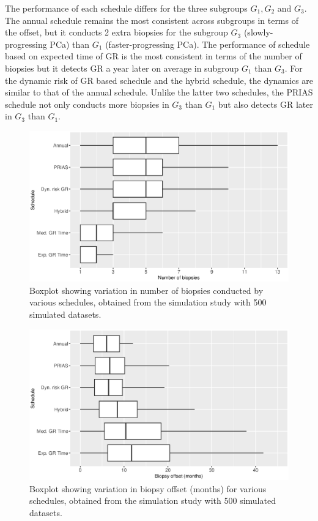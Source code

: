 The performance of each schedule differs for the three subgroups $G_1, G_2$ and $G_3$. The annual schedule remains the most consistent across subgroups in terms of the offset, but it conducts 2 extra biopsies for the subgroup $G_3$ (slowly-progressing PCa) than $G_1$ (faster-progressing PCa). The performance of schedule based on expected time of GR is the most consistent in terms of the number of biopsies but it detects GR a year later on average in subgroup $G_1$ than $G_3$. For the dynamic risk of GR based schedule and the hybrid schedule, the dynamics are similar to that of the annual schedule. Unlike the latter two schedules, the PRIAS schedule not only conducts more biopsies in $G_3$ than $G_1$ but also detects GR later in $G_3$ than $G_1$.

\begin{figure}[!htb]
\centerline{\includegraphics[width=\columnwidth]{images/sim_study/nbBoxPlot_all.eps}}
\caption{Boxplot showing variation in number of biopsies conducted by various schedules, obtained from the simulation study with 500 simulated datasets.}
\label{fig : nbBoxPlot_all}
\end{figure}

\begin{figure}[!htb]
\centerline{\includegraphics[width=\columnwidth]{images/sim_study/offsetBoxPlot_all.eps}}
\caption{Boxplot showing variation in biopsy offset (months) for various schedules, obtained from the simulation study with 500 simulated datasets.}
\label{fig : offsetBoxPlot_all}
\end{figure}

